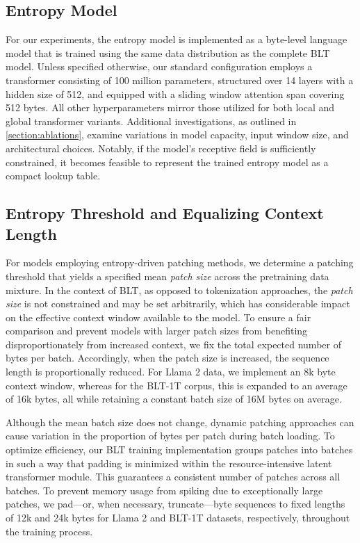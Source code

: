 \subsection{Entropy Model}
For our experiments, the entropy model is implemented as a byte-level language model that is trained using the same data distribution as the complete {\textsc BLT} model. Unless specified otherwise, our standard configuration employs a transformer consisting of 100 million parameters, structured over 14 layers with a hidden size of 512, and equipped with a sliding window attention span covering 512 bytes. All other hyperparameters mirror those utilized for both local and global transformer variants. Additional investigations, as outlined in \autoref{section:ablations}, examine variations in model capacity, input window size, and architectural choices. Notably, if the model’s receptive field is sufficiently constrained, it becomes feasible to represent the trained entropy model as a compact lookup table.

\subsection{Entropy Threshold and Equalizing Context Length} For models employing entropy-driven patching methods, we determine a patching threshold that yields a specified mean \textit{patch size} across the pretraining data mixture. In the context of {\textsc BLT}, as opposed to tokenization approaches, the \textit{patch size} is not constrained and may be set arbitrarily, which has considerable impact on the effective context window available to the model. To ensure a fair comparison and prevent models with larger patch sizes from benefiting disproportionately from increased context, we fix the total expected number of bytes per batch. Accordingly, when the patch size is increased, the sequence length is proportionally reduced. For Llama 2 data, we implement an 8k byte context window, whereas for the {\textsc BLT}-1T corpus, this is expanded to an average of 16k bytes, all while retaining a constant batch size of 16M bytes on average.

Although the mean batch size does not change, dynamic patching approaches can cause variation in the proportion of bytes per patch during batch loading. To optimize efficiency, our {\textsc BLT} training implementation groups patches into batches in such a way that padding is minimized within the resource-intensive latent transformer module. This guarantees a consistent number of patches across all batches. To prevent memory usage from spiking due to exceptionally large patches, we pad—or, when necessary, truncate—byte sequences to fixed lengths of 12k and 24k bytes for Llama 2 and {\textsc BLT}-1T datasets, respectively, throughout the training process.

